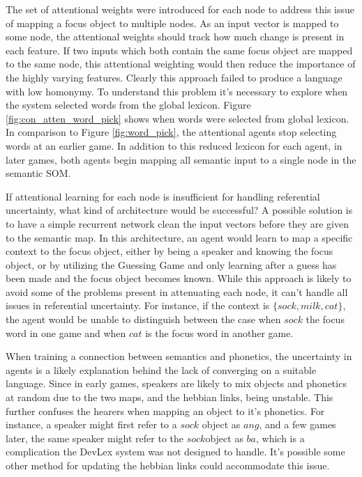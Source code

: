 \documentclass[a4paper,11pt]{article}
\begin{document}
The set of attentional weights were introduced for each node to address this
issue of mapping a focus object to multiple nodes.  As an input vector is mapped
to some node, the attentional weights should track how much change is present in
each feature.  If two inputs which both contain the same focus object are mapped
to the same node, this attentional weighting would then reduce the importance of
the highly varying features.  Clearly this approach failed to produce a language
with low homonymy.  To understand this problem it's necessary to explore when
the system selected words from the global lexicon.  Figure
\ref{fig:con_atten_word_pick} shows when words were selected from global
lexicon.  In comparison to Figure \ref{fig:word_pick}, the attentional agents
stop selecting words at an earlier game.  In addition to this reduced lexicon
for each agent, in later games, both agents begin mapping all semantic input to
a single node in the semantic SOM.

If attentional learning for each node is insufficient for handling referential
uncertainty, what kind of architecture would be successful?  A possible solution
is to have a simple recurrent network clean the input vectors before they are
given to the semantic map.  In this architecture, an agent would learn to map a
specific context to the focus object, either by being a speaker and knowing the
focus object, or by utilizing the Guessing Game and only learning after a guess
has been made and the focus object becomes known.  While this approach is likely
to avoid some of the problems present in attenuating each node, it can't handle
all issues in referential uncertainty.  For instance, if the context is $\{sock,
milk, cat\}$, the agent would be unable to distinguish between the case when
$sock$ the focus word in one game and when $cat$ is the focus word in another
game.

When training a connection between semantics and phonetics, the uncertainty in
agents is a likely explanation behind the lack of converging on a suitable
language.  Since in early games, speakers are likely to mix objects and
phonetics at random due to the two maps, and the hebbian links, being unstable.
This further confuses the hearers when mapping an object to it's phonetics.  For
instance, a speaker might first refer to a $sock$ object as $ang$, and a few
games later, the same speaker might refer to the $sock$object as $ba$, which is
a complication the DevLex system was not designed to handle.  It's possible some
other method for updating the hebbian links could accommodate this issue.
\end{document}
